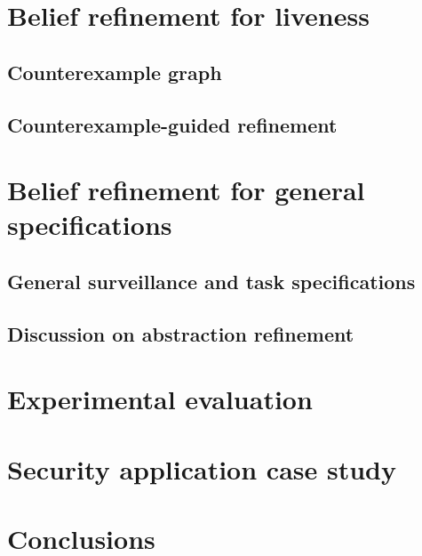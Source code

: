 \section{Belief refinement for liveness}%
\subsection{Counterexample graph}

\subsection{Counterexample-guided refinement}

%
%
\section{Belief refinement for general specifications}%
%
\subsection{General surveillance and task specifications}

\subsection{Discussion on abstraction refinement}

%
\section{Experimental evaluation}\label{sec:experiments}

%
%
\section{Security application case study}
%


%
%
%
\section{Conclusions}


